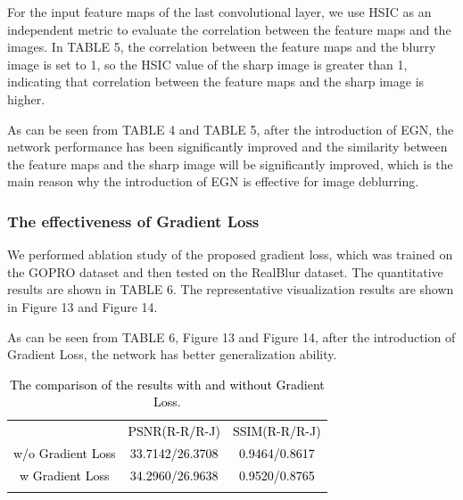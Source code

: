 \begin{sloppypar}
For the input feature maps of the last convolutional layer, we use HSIC as an independent metric to evaluate the correlation between the feature maps and the images. In TABLE 5, the correlation between the feature maps and the blurry image is set to 1, so the HSIC value of the sharp image is greater than 1, indicating that correlation between the feature maps and the sharp image is higher.

As can be seen from TABLE 4 and TABLE 5, after the introduction of EGN, the network performance has been significantly improved and the similarity between the feature maps and the sharp image will be significantly improved, which is the main reason why the introduction of EGN is effective for image deblurring.


\subsubsection{The effectiveness of Gradient Loss}
We performed ablation study of the proposed gradient loss, which was trained on the GOPRO dataset and then tested on the RealBlur dataset. The quantitative results are shown in TABLE 6. The representative visualization results are shown in Figure 13 and Figure 14.

As can be seen from TABLE 6, Figure 13 and Figure 14, after the introduction of Gradient Loss, the network has better generalization ability.

\begin{table}[!t]
\renewcommand{\arraystretch}{1.3}

\caption{\textcolor{black}{The comparison of the results with and without Gradient Loss.}
}
\label{table6}
\centering
\begin{tabular}{ccc}
\hline\noalign{\smallskip}
 & \textcolor{black}{PSNR(R-R/R-J)} & \textcolor{black}{SSIM(R-R/R-J)}  \\
\noalign{\smallskip}\hline\noalign{\smallskip}
\textcolor{black}{w/o Gradient Loss} & \textcolor{black}{33.7142/26.3708} & \textcolor{black}{0.9464/0.8617} \\

\textcolor{black}{w Gradient Loss} & \textcolor{black}{34.2960/26.9638} & \textcolor{black}{0.9520/0.8765} \\

\noalign{\smallskip}\hline
\end{tabular}
\end{table}



\end{sloppypar}
